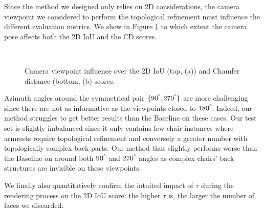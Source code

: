 Since the method we designed only relies on 2D considerations, the camera viewpoint we considered to perform the topological refinement must influence the different evaluation metrics. We show in Figure \ref{fig:pruning_viewpoint_influence} to which extent the camera pose affects both the 2D IoU and the CD scores.


\begin{figure}[h!]
  \centering
   \\
  \caption{Camera viewpoint influence over the 2D IoU (top, (a)) and Chamfer distance (bottom, (b) scores.} \label{fig:pruning_viewpoint_influence}
\end{figure}


Azimuth angles around the symmetrical pair $\{90^{\degree}, 270^{\degree}\}$ are more challenging since there are not as informative as the viewpoints closed to $180^{\degree}$. Indeed, our method struggles to get better results than the Baseline on these cases. Our test set is slightly imbalanced since it only contains few chair instances where armrests require topological refinement and conversely a greater number with topologically complex back parts. Our method thus slightly performs worse than the Baseline on around both $90^{\degree}$ and $270^{\degree}$ angles as complex chairs' back structures are invisible on these viewpoints. 

We finally also quantitatively confirm the intuited impact of $\tau$ during the rendering process on the 2D IoU score: the higher $\tau$ is, the larger the number of faces we discarded. 


